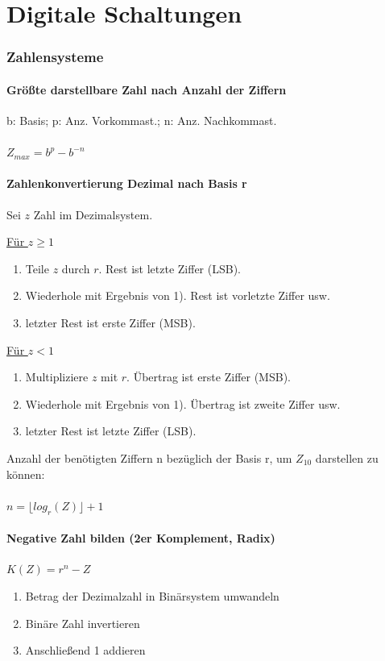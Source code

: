 \documentclass[a4paper,twocolumn,10pt]{article}
\begin{document}
\part*{Digitale Schaltungen}

\section*{Zahlensysteme}

\subsection*{Größte darstellbare Zahl nach Anzahl der Ziffern}
b: Basis; p: Anz. Vorkommast.; n: Anz. Nachkommast.\\\\
$Z_{max}=b^p-b^{-n}$

\subsection*{Zahlenkonvertierung Dezimal nach Basis r}
Sei $z$ Zahl im Dezimalsystem.

\underline{Für $z \geq 1$}
\begin{enumerate}
	\item Teile $z$ durch $r$. Rest ist letzte Ziffer (LSB).
	\item Wiederhole mit Ergebnis von 1). Rest ist vorletzte Ziffer usw.
	\item letzter Rest ist erste Ziffer (MSB).
\end{enumerate}

\underline{Für $z<1$}
\begin{enumerate}
	\item Multipliziere $z$ mit $r$. Übertrag ist erste Ziffer (MSB).
	\item Wiederhole mit Ergebnis von 1). Übertrag ist zweite Ziffer usw.
	\item letzter Rest ist letzte Ziffer (LSB).
\end{enumerate}
Anzahl der benötigten Ziffern n bezüglich der Basis r, um $Z_{10}$ darstellen zu können:\\\\
$n=\lfloor log_r(Z)\rfloor +1$

\subsection*{Negative Zahl bilden (2er Komplement, Radix)}
$K(Z)=r^n-Z$
\begin{enumerate}
	\item Betrag der Dezimalzahl in Binärsystem umwandeln
	\item Binäre Zahl invertieren
	\item Anschließend 1 addieren
\end{enumerate}
\end{document}
